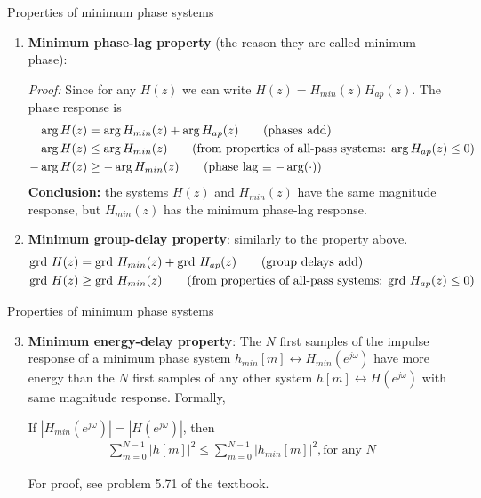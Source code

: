 \documentclass[10pt]{beamer}
\begin{document}
\begin{frame}{Properties of minimum phase systems}
\begin{enumerate}
	\item \textbf{Minimum phase-lag property} (the reason they are called minimum phase):
	
	\textit{Proof:}
	Since for any $H(z)$ we can write $H(z) = H_{min}(z)H_{ap}(z)$. The phase response is
	\begin{align*}
	\arg H(z) &= \arg H_{min}(z) + \arg H_{ap}(z) \tag{phases add} \\
	\arg H(z) &\leq \arg H_{min}(z) \tag{from properties of all-pass systems: $\arg H_{ap}(z) \leq 0$} \\
	-\arg H(z) &\geq -\arg H_{min}(z) \tag{phase lag $\equiv -\arg(\cdot)$}
	\end{align*} 
	\pause
	\textbf{Conclusion:} the systems $H(z)$ and $H_{min}(z)$ have the same magnitude response, but $H_{min}(z)$ has the minimum phase-lag response.
	\pause
	\item \textbf{Minimum group-delay property}: similarly to the property above. 
	\begin{align*}
	\mathrm{grd}~H(z) &= \mathrm{grd}~  H_{min}(z) + \mathrm{grd}~  H_{ap}(z) \tag{group delays add} \\
	\mathrm{grd}~  H(z) &\geq \mathrm{grd}~  H_{min}(z) \tag{from properties of all-pass systems: $\mathrm{grd}~  H_{ap}(z) \leq 0$}
	\end{align*} 
\end{enumerate}

\end{frame}


\begin{frame}{Properties of minimum phase systems}
\begin{enumerate}\setcounter{enumi}{2}
	\item \textbf{Minimum energy-delay property}: The $N$ first samples of the impulse response of a minimum phase system $h_{min}[m] \leftrightarrow H_{min}(e^{j\omega})$ have more energy than the $N$ first samples of any other system $h[m]\leftrightarrow H(e^{j\omega})$ with same magnitude response. Formally,
	
	If $|H_{min}(e^{j\omega})| = |H(e^{j\omega})|$, then
	\begin{align*}
	\sum_{m = 0}^{N-1} |h[m]|^2 \leq \sum_{m = 0}^{N-1} |h_{min}[m]|^2, \text{for any $N$}
	\end{align*}
	
	For proof, see problem 5.71 of the textbook.	
\end{enumerate}
\end{frame}
\end{document}
